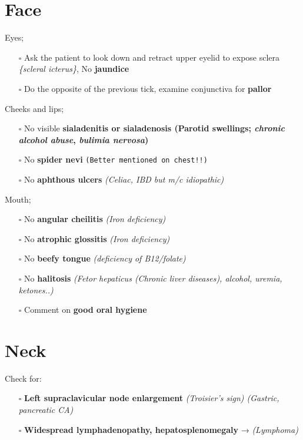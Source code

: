 \documentclass[
  13.5pt,
  a4paper,
  DIV=11,
  numbers=noendperiod]{scrreprt}
\providecommand{\tightlist}{%
  \setlength{\itemsep}{0pt}\setlength{\parskip}{0pt}}
\begin{document}
\section{Face}\label{face-1}

Eyes;

\begin{itemize}
\tightlist
\item[$\square$]
  Ask the patient to look down and retract upper eyelid to expose sclera
  \emph{\{scleral icterus\}}, No \textbf{jaundice}
\item[$\square$]
  Do the opposite of the previous tick, examine conjunctiva for
  \textbf{pallor}
\end{itemize}

Cheeks and lips;

\begin{itemize}
\tightlist
\item[$\square$]
  No visible \textbf{sialadenitis or sialadenosis (Parotid swellings;
  \emph{chronic alcohol abuse}, \emph{bulimia nervosa})}
\item[$\square$]
  No \textbf{spider nevi} \texttt{(Better\ mentioned\ on\ chest!!)}
\item[$\square$]
  No \textbf{aphthous ulcers} \emph{(Celiac, IBD but m/c idiopathic)}
\end{itemize}

Mouth;

\begin{itemize}
\tightlist
\item[$\square$]
  No \textbf{angular cheilitis} \emph{(Iron deficiency)}
\item[$\square$]
  No \textbf{atrophic glossitis} \emph{(Iron deficiency)}
\item[$\square$]
  No \textbf{beefy tongue} \emph{(deficiency of B12/folate)}
\item[$\square$]
  No \textbf{halitosis} \emph{(Fetor hepaticus (Chronic liver diseases),
  alcohol, uremia, ketones..)}
\item[$\square$]
  Comment on \textbf{good oral hygiene}
\end{itemize}

\section{Neck}\label{neck}

Check for:

\begin{itemize}
\tightlist
\item[$\square$]
  \textbf{Left supraclavicular node enlargement} \emph{(Troisier's sign)
  (Gastric, pancreatic CA)}
\item[$\square$]
  \textbf{Widespread lymphadenopathy, hepatosplenomegaly} →
  \emph{(Lymphoma)}
\end{itemize}
\end{document}

